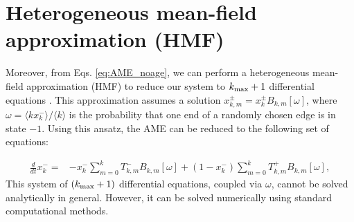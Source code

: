 

\section{\label{sec:Heterogeneous mean-field approximation}  Heterogeneous mean-field approximation (HMF)}

Moreover, from Eqs. \eqref{eq:AME_noage}, we can perform a heterogeneous mean-field approximation (HMF) to reduce our system to $k_{\rm max}+1$ differential equations \cite{gleeson-2013}. This approximation assumes a solution $x^{\pm}_{k,m} = x_{k}^{\pm} B_{k,m} [\omega]$, where $\omega = \langle k x^{-}_{k} \rangle / \langle k \rangle$ is the probability that one end of a randomly chosen edge is in state $-1$. Using this ansatz, the AME can be reduced to the following set of equations:

\begin{align}
    \frac{d}{d t} x^{-}_{k}= &- x^{-}_{k} \sum_{m=0}^{k} T^{-}_{k, m} B_{k, m}[\omega] +\left(1-x^{-}_{k}\right) \sum_{m=0}^{k} T^{+}_{k, m} B_{k, m}[\omega],
    \label{eq:HMF}
\end{align}
This system of $(k_{\rm max}+1)$ differential equations, coupled via $\omega$, cannot be solved analytically in general. However, it can be solved numerically using standard computational methods.


